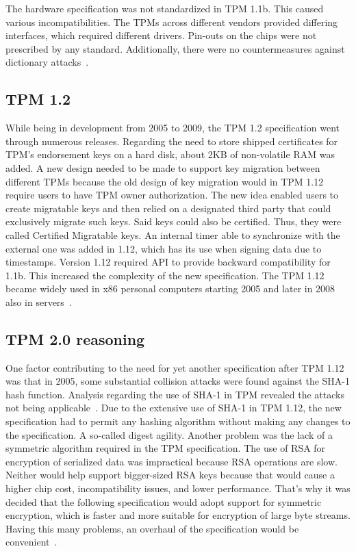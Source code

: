 The hardware specification was not standardized in TPM 1.1b. This caused various incompatibilities. The TPMs across different vendors provided differing interfaces, which required different drivers. Pin-outs on the chips were not prescribed by any standard. Additionally, there were no countermeasures against dictionary attacks~\cite[p.~2]{arthur2015practical}.

\subsection{TPM 1.2}
While being in development from 2005 to 2009, the TPM 1.2 specification went through numerous releases. Regarding the need to store shipped certificates for TPM's endorsement keys on a hard disk, about 2KB of non-volatile RAM was added. A new design needed to be made to support key migration between different TPMs because the old design of key migration would in TPM 1.12 require users to have TPM owner authorization. The new idea enabled users to create migratable keys and then relied on a designated third party that could exclusively migrate such keys. Said keys could also be certified. Thus, they were called Certified Migratable keys. An internal timer able to synchronize with the external one was added in 1.12, which has its use when signing data due to timestamps. Version 1.12 required API to provide backward compatibility for 1.1b. This increased the complexity of the new specification. The TPM 1.12 became widely used in x86 personal computers starting 2005 and later in 2008 also in servers~\cite[p.~3]{arthur2015practical}.

\subsection{TPM 2.0 reasoning}
One factor contributing to the need for yet another specification after TPM 1.12 was that in 2005, some substantial collision attacks were found against the SHA-1 hash function. Analysis regarding the use of SHA-1 in TPM revealed the attacks not being applicable~\cite{tcg_tpm1.12_sha-1_uses}. Due to the extensive use of SHA-1 in TPM 1.12, the new specification had to permit any hashing algorithm without making any changes to the specification. A so-called digest agility. Another problem was the lack of a symmetric algorithm required in the TPM specification. The use of RSA for encryption of serialized data was impractical because RSA operations are slow. Neither would help support bigger-sized RSA keys because that would cause a higher chip cost, incompatibility issues, and lower performance. That's why it was decided that the following specification would adopt support for symmetric encryption, which is faster and more suitable for encryption of large byte streams. Having this many problems, an overhaul of the specification would be convenient~\cite[p.~4]{arthur2015practical}.



